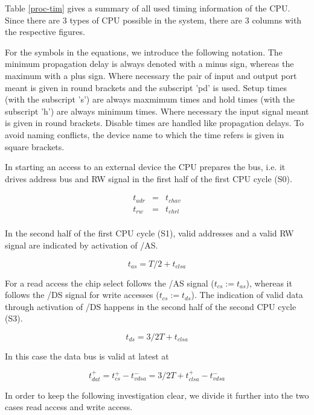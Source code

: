 \documentclass[12pt]{article}
\newcommand{\beqn}{\begin{eqnarray*}}
\newcommand{\eeqn}{\end{eqnarray*}}
\begin{document}
Table \ref{proc-tim} gives a summary of all used timing information of
the CPU. Since there are 3 types of CPU possible in the system, there
are 3 columns with the respective figures.

For the symbols in the equations, we introduce the following
notation. The minimum propagation delay is always denoted with a minus
sign, whereas the maximum with a plus sign. Where necessary the pair
of input and output port meant is given in round brackets and the
subscript 'pd' is used. Setup times (with the subscript 's') are
always maxmimum times and hold times (with the subscript 'h') are
always minimum times. Where necessary the input signal meant is given
in round brackets. Disable times are handled like propagation
delays. To avoid naming conflicts, the device name to which the time
refers is given in square brackets.

In starting an access to an external device the CPU prepares the bus,
i.e. it drives address bus and RW signal in the first half of the
first CPU cycle (S0).

\beqn
t_{adr} &=& t_{chav}\\
t_{rw} &=& t_{chrl}\\
\eeqn

In the second half of the first CPU cycle (S1), valid addresses and a
valid RW signal are indicated by activation of /AS.

\[ t_{as} = T/2 + t_{clsa} \]

For a read access the chip select follows the /AS signal ($t_{cs} :=
t_{as}$), whereas it follows the /DS signal for write accesses ($t_{cs}
:= t_{ds}$). The indication of valid data through activation of /DS
happens in the second half of the second CPU cycle (S3).

\[ t_{ds} = 3/2 T + t_{clsa} \]

In this case the data bus is valid at latest at

\[ t_{dat}^+ = t_{cs}^+ - t_{vdsa}^- = 3/2 T + t_{clsa}^+ - t_{vdsa}^- \]

In order to keep the following investigation clear, we divide it
further into the two cases read access and write access.
\end{document}
